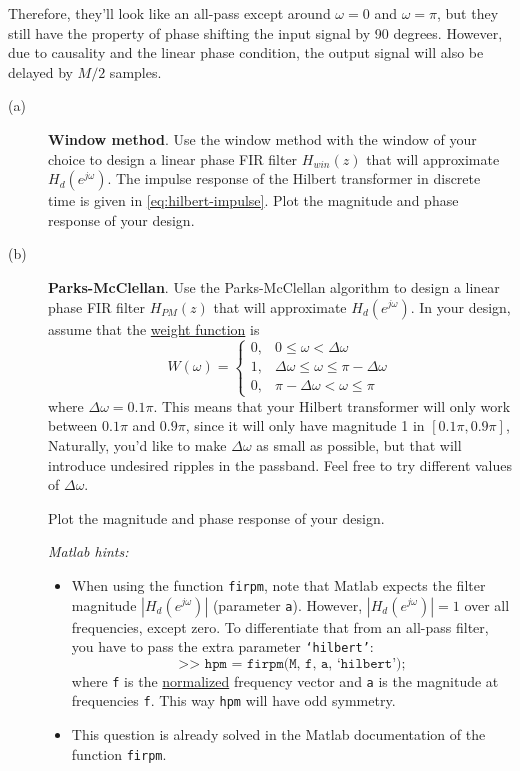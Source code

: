 \documentclass[12pt]{report}
\begin{document}
Therefore, they'll look like an all-pass except around $\omega = 0$ and $\omega = \pi$, but they still have the property of phase shifting the input signal by 90 degrees. However, due to causality and the linear phase condition, the output signal will also be delayed by $M/2$ samples.

\begin{description}
	\item[(a)] \textbf{Window method}. Use the window method with the window of your choice to design a linear phase FIR filter $H_{win}(z)$ that will approximate $H_{d}(e^{j\omega})$. The impulse response of the Hilbert transformer in discrete time is given in \eqref{eq:hilbert-impulse}. Plot the magnitude and phase response of your design.
	
	\item[(b)] \textbf{Parks-McClellan}. Use the Parks-McClellan algorithm to design a linear phase FIR filter $H_{PM}(z)$ that will approximate $H_{d}(e^{j\omega})$. In your design, assume that the \underline{weight function} is 
	\begin{equation}
		W(\omega) = \begin{cases}
		0, & 0 \leq \omega < \Delta\omega \\
		1, & \Delta\omega \leq \omega \leq \pi-\Delta\omega \\
		0, & \pi-\Delta\omega < \omega \leq \pi
		\end{cases}
	\end{equation}
	where $\Delta\omega = 0.1\pi$. This means that your Hilbert transformer will only work between $0.1\pi$ and $0.9\pi$, since it will only have magnitude 1 in $[0.1\pi, 0.9\pi]$,  Naturally, you'd like to make $\Delta\omega$ as small as possible, but that will introduce undesired ripples in the passband. Feel free to try different values of $\Delta\omega$.
	
	Plot the magnitude and phase response of your design.

	\textit{Matlab hints:} 
	\begin{itemize}
		\item When using the function \texttt{firpm}, note that Matlab expects the filter magnitude $|H_{d}(e^{j\omega})|$ (parameter \texttt{a}). However, $|H_{d}(e^{j\omega})| = 1$ over all frequencies, except zero. To differentiate that from an all-pass filter, you have to pass the extra parameter \texttt{`hilbert'}: 
		\begin{equation*}
		\texttt{>> hpm = firpm(M, f, a, `hilbert');}
		\end{equation*}
		where \texttt{f} is the \underline{normalized} frequency vector and \texttt{a} is the magnitude at frequencies \texttt{f}. This way \texttt{hpm} will have odd symmetry.
		\item This question is already solved in the Matlab documentation of the function \texttt{firpm}.
	\end{itemize}
	

\end{description}
\end{document}
